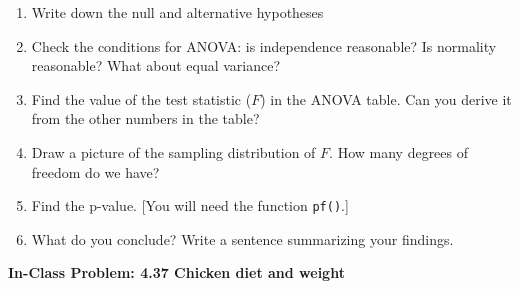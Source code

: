 \documentclass[10pt]{article}\usepackage[]{graphicx}\usepackage[]{color}
\newcommand{\cmd}[1]{\texttt{#1}}
\begin{document}
\begin{enumerate}
  \itemsep1.25in
  \item Write down the null and alternative hypotheses
  \item Check the conditions for ANOVA: is independence reasonable? Is normality reasonable? What about equal variance?
  \item Find the value of the test statistic ($F$) in the ANOVA table. Can you derive it from the other numbers in the table?
  \item Draw a picture of the sampling distribution of $F$. How many degrees of freedom do we have?
  \item Find the p-value. [You will need the function \cmd{pf()}.]
  \item What do you conclude? Write a sentence summarizing your findings.
  \vspace{1.25in}
\end{enumerate}




{\bf In-Class Problem: 4.37 Chicken diet and weight}
\end{document}
